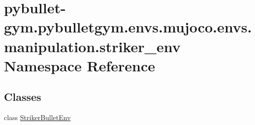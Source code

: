 \hypertarget{namespacepybullet-gym_1_1pybulletgym_1_1envs_1_1mujoco_1_1envs_1_1manipulation_1_1striker__env}{}\section{pybullet-\/gym.pybulletgym.\+envs.\+mujoco.\+envs.\+manipulation.\+striker\+\_\+env Namespace Reference}
\label{namespacepybullet-gym_1_1pybulletgym_1_1envs_1_1mujoco_1_1envs_1_1manipulation_1_1striker__env}
\subsection*{Classes}
\begin{DoxyCompactItemize}
\item 
class \hyperlink{classpybullet-gym_1_1pybulletgym_1_1envs_1_1mujoco_1_1envs_1_1manipulation_1_1striker__env_1_1_striker_bullet_env}{Striker\+Bullet\+Env}
\end{DoxyCompactItemize}
